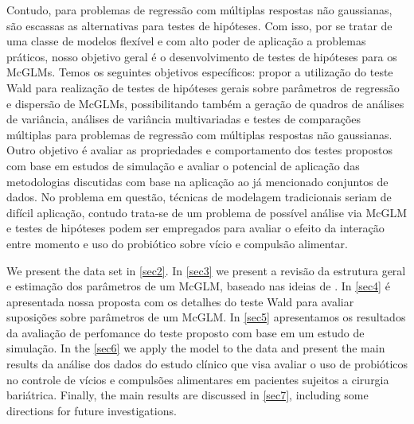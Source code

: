 \documentclass[AMA,STIX1COL]{WileyNJD-v2}
\begin{document}

Contudo, para problemas de regressão com múltiplas respostas não gaussianas, são escassas as alternativas para testes de hipóteses. Com isso, por se tratar de uma classe de modelos flexível e com alto poder de aplicação a problemas práticos, nosso objetivo geral é o desenvolvimento de testes de hipóteses para os McGLMs. Temos os seguintes objetivos específicos: propor a utilização do teste Wald para realização de testes de hipóteses gerais sobre parâmetros de regressão e dispersão de McGLMs, possibilitando também a geração de quadros de análises de variância, análises de variância multivariadas e testes de comparações múltiplas para problemas de regressão com múltiplas respostas não gaussianas. Outro objetivo é avaliar as propriedades e comportamento dos testes propostos com base em estudos de simulação e avaliar o potencial de aplicação das metodologias discutidas com base na aplicação ao já mencionado conjuntos de dados. No problema em questão, técnicas de modelagem tradicionais seriam de difícil aplicação, contudo trata-se de um problema de possível análise via McGLM e testes de hipóteses podem ser empregados para avaliar o efeito da interação entre momento e uso do probiótico sobre vício e compulsão alimentar.


We present the data set in \autoref{sec2}. In \autoref{sec3} we present a revisão da estrutura geral e estimação dos parâmetros de um McGLM, baseado nas ideias de \cite{Bonat16}. In \autoref{sec4} é apresentada nossa proposta com os detalhes do teste Wald para avaliar suposições sobre parâmetros de um McGLM. In \autoref{sec5} apresentamos os resultados da avaliação de perfomance do teste proposto com base em um estudo de simulação. In the \autoref{sec6} we apply the model to the data and present the main results da análise dos dados do estudo clínico que visa avaliar o uso de probióticos no controle de vícios e compulsões alimentares em pacientes sujeitos a cirurgia bariátrica. Finally, the main results are discussed in \autoref{sec7}, including some directions for future investigations.

\end{document}
